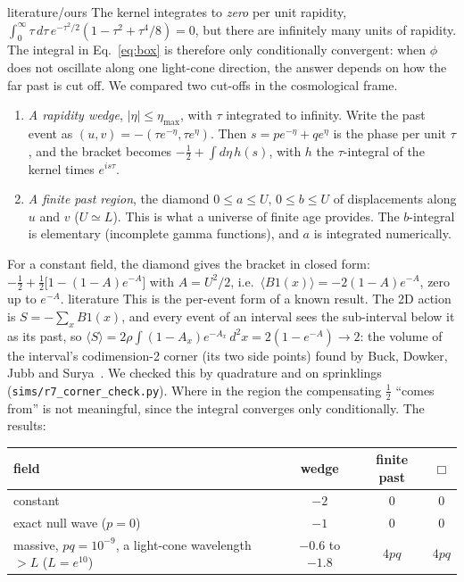 \documentclass[11pt,a4paper]{article}
\newcommand{\tagbox}[2]{\textsf{\scriptsize\colorbox{#1!12}{\textcolor{#1!70!black}{#2}}}}
\newcommand{\lit}{\tagbox{blue}{literature}}
\newcommand{\ours}{\tagbox{orange}{ours}}
\begin{document}
\lit{}/\ours{} The kernel integrates to \emph{zero} per unit rapidity, $\int_0^\infty\tau\,d\tau\,e^{-\tau^2/2}(1-\tau^2+\tau^4/8)=0$, but there are infinitely many units of rapidity. The integral in Eq.~\eqref{eq:box} is therefore only conditionally convergent: when $\phi$ does not oscillate along one light-cone direction, the answer depends on how the far past is cut off. We compared two cut-offs in the cosmological frame.
\begin{enumerate}[leftmargin=*,itemsep=1pt]
\item \emph{A rapidity wedge}, $|\eta|\le\eta_{\max}$, with $\tau$ integrated to infinity. Write the past event as $(u,v)=-(\tau e^{-\eta},\tau e^{\eta})$. Then $s=pe^{-\eta}+qe^{\eta}$ is the phase per unit $\tau$, and the bracket becomes $-\tfrac12+\int d\eta\,h(s)$, with $h$ the $\tau$-integral of the kernel times $e^{is\tau}$.
\item \emph{A finite past region}, the diamond $0\le a\le U$, $0\le b\le U$ of displacements along $u$ and $v$ ($U\simeq L$). This is what a universe of finite age provides. The $b$-integral is elementary (incomplete gamma functions), and $a$ is integrated numerically.
\end{enumerate}
For a constant field, the diamond gives the bracket in closed form: $-\tfrac12+\tfrac12\big[1-(1-A)e^{-A}\big]$ with $A=U^2/2$, i.e.\ $\langle B1(x)\rangle=-2(1-A)e^{-A}$, zero up to $e^{-A}$. \lit{} This is the per-event form of a known result. The 2D action is $S=-\sum_xB1(x)$, and every event of an interval sees the sub-interval below it as its past, so $\langle S\rangle=2\rho\int(1-A_x)e^{-A_x}\,d^2x=2(1-e^{-A})\to2$: the volume of the interval's codimension-2 corner (its two side points) found by Buck, Dowker, Jubb and Surya~\cite{BDJS15}. We checked this by quadrature and on sprinklings (\texttt{sims/r7\_corner\_check.py}). Where in the region the compensating $\tfrac12$ ``comes from'' is not meaningful, since the integral converges only conditionally. The results:
\begin{center}\small
\begin{tabular}{@{}lccc@{}}
\toprule
field & wedge & finite past & $\Box$\\
\midrule
constant & $-2$ & $0$ & $0$\\
exact null wave ($p=0$) & $-1$ & $0$ & $0$\\
massive, $pq=10^{-9}$, a light-cone wavelength $>L$ ($L=e^{10}$) & $-0.6$ to $-1.8$ & $4pq$ & $4pq$\\
\bottomrule
\end{tabular}
\end{center}
\end{document}
